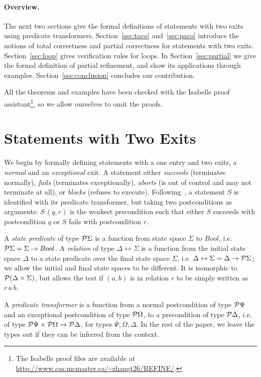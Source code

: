 \documentclass[submission,copyright,creativecommons]{eptcs}
\newcommand{\fun}{\rightarrow}
\begin{document}
\paragraph{Overview.} The next two sections give the formal definitions of statements with two exits using predicate transformers. Section~\ref{sec:toco} and~\ref{sec:paco} introduce the notions of total correctness and partial correctness for statements with two exits. Section~\ref{sec:loop} gives verification rules for loops. In Section~\ref{sec:partial} we give the formal definition of partial refinement, and show its applications through examples. Section~\ref{sec:conclusion} concludes our contribution.

All the theorems and examples have been checked with the Isabelle proof assistant\footnote{The Isabelle proof files are available at \url{http://www.cas.mcmaster.ca/~zhangt26/REFINE/}.}, so we allow ourselves to omit the proofs.

\section{Statements with Two Exits}
\label{sec:basic}

We begin by formally defining statements with a one entry and two exits, a {\em normal} and an {\em exceptional} exit.  A statement either {\em succeeds} (terminates normally), {\em fails} (terminates exceptionally), {\em aborts} (is out of control and may not terminate at all), or {\em blocks} (refuses to execute). Following~\cite{BackVonWright98RefinementCalculus}, a statement $S$ is identified with its predicate transformer, but taking two postconditions as arguments: $S\,(q, r)$ is the weakest precondition such that either $S$ succeeds with postcondition $q$ or $S$ fails with postcondition $r$.

A {\em state predicate} of type ${\cal P} \Sigma$ is a function from state space $\Sigma$ to $Bool$, i.e.~${\cal P} \Sigma = \Sigma \fun Bool$. A {\em relation} of type $\Delta \leftrightarrow \Sigma$ is a function from the initial state space $\Delta$ to a state predicate over the final state space $\Sigma$, i.e. $\Delta \leftrightarrow \Sigma = \Delta \fun {\cal P} \Sigma$; we allow the initial and final state spaces to be different. It is isomorphic to ${\cal P} (\Delta \times \Sigma)$, but allows the test if $(a, b)$ is in relation $r$ to be simply written as $r\,a\,b$.

A {\em predicate transformer} is a function from a normal postcondition of type ${\cal P} \Psi$ and an exceptional postcondition of type ${\cal P} \Omega$, to a precondition of type ${\cal P} \Delta$, i.e. of type ${\cal P} \Psi \times {\cal P} \Omega \fun {\cal P} \Delta$, for types $\Psi, \Omega, \Delta$. In the rest of the paper, we leave the types out if they can be inferred from the context.
\end{document}
